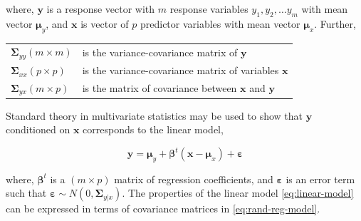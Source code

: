 \documentclass[review]{elsarticle}
\theoremstyle{definition}
\theoremstyle{definition}
\theoremstyle{definition}
\theoremstyle{remark}
\begin{document}
where, \(\mathbf{y}\) is a response vector with \(m\) response variables
\(y_1, y_2, \ldots y_m\) with mean vector \(\boldsymbol{\mu}_y\), and
\(\mathbf{x}\) is vector of \(p\) predictor variables with mean vector
\(\boldsymbol{\mu}_x\). Further,

\begin{longtable}[]{@{}ll@{}}
\toprule
\(\boldsymbol{\Sigma}_{yy} (m \times m)\) & is the variance-covariance
matrix of \(\mathbf{y}\)\tabularnewline
\(\boldsymbol{\Sigma}_{xx} (p \times p)\) & is the variance-covariance
matrix of variables \(\mathbf{x}\)\tabularnewline
\(\boldsymbol{\Sigma}_{yx} (m \times p)\) & is the matrix of covariance
between \(\mathbf{x}\) and \(\mathbf{y}\)\tabularnewline
\bottomrule
\end{longtable}

\addtocounter{table}{-1}

Standard theory in multivariate statistics may be used to show that
\(\mathbf{y}\) conditioned on \(\mathbf{x}\) corresponds to the linear
model,

\begin{equation}
\mathbf{y} = \boldsymbol{\mu}_y + \boldsymbol{\beta}^t (\mathbf{x} - \boldsymbol{\mu}_x) + \boldsymbol{\varepsilon}
  \label{eq:linear-model}
\end{equation}

where, \(\boldsymbol{\beta}^t\) is a \((m \times p)\) matrix of
regression coefficients, and \(\boldsymbol{\varepsilon}\) is an error
term such that
\(\boldsymbol{\varepsilon} \sim N\left(0, \boldsymbol{\Sigma}_{y|x}\right)\).
The properties of the linear model \eqref{eq:linear-model} can be
expressed in terms of covariance matrices in \eqref{eq:rand-reg-model}.
\end{document}
